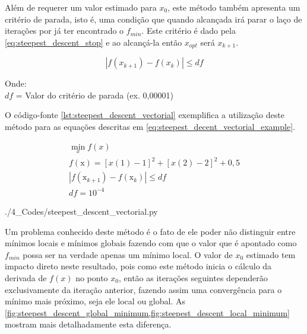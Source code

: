 Além de requerer um valor estimado para $x_0$, este método também apresenta um
critério de parada, isto é, uma condição que quando alcançada irá parar o laço de
iterações por já ter encontrado o $f_{min}$. Este critério é dado pela \cref{eq:steepest_descent_stop}
e ao alcançá-la então $x_{opt}$ será $x_{k+1}$.

\begin{equation}
	\label{eq:steepest_descent_stop}
	|f(x_{k+1})-f(x_k)| \leq df
\end{equation}

\noindent
Onde: \\
$df$ = Valor do critério de parada (ex. 0,00001)
\newline

O código-fonte \ref{lst:steepest_descent_vectorial} exemplifica a utilização deste método
para as equações descritas em \ref{eq:steepest_decent_vectorial_example}.

\begin{subequations}
	\label{eq:steepest_decent_vectorial_example}
	\begin{gather}
		\min_{x} f(x) \\ 
		f(\mathrm{x}) = [x(1) - 1]^2 + [x(2) - 2]^2 + 0,5		\label{eq:steepest_decent_vectorial_example_fobj} \\
		|f(\mathrm{x}_{k+1}) - f(\mathrm{x}_k)| \leq df 		\label{eq:steepest_decent_vectorial_example_stop} \\
		df = 10^{-4}											\label{eq:steepest_decent_vectorial_example_df}
	\end{gather}
\end{subequations}


	{./4_Codes/steepest_descent_vectorial.py}
	\begin{center}
	\end{center}

Um problema conhecido deste método é o fato de ele poder não distinguir entre
mínimos locais e mínimos globais fazendo com que o valor que é apontado como
$f_{min}$ possa ser na verdade apenas um mínimo local. O valor de $x_0$
estimado tem impacto direto neste resultado, pois como este método
inicia o cálculo da derivada de $f(x)$ no ponto $x_0$, então as iterações seguintes
dependerão exclusivamente da iteração anterior, fazendo assim uma convergência para
o mínimo mais próximo, seja ele local ou global. As
\cref{fig:steepest_descent_global_minimum,fig:steepest_descent_local_minimum}
mostram mais detalhadamente esta diferença.

